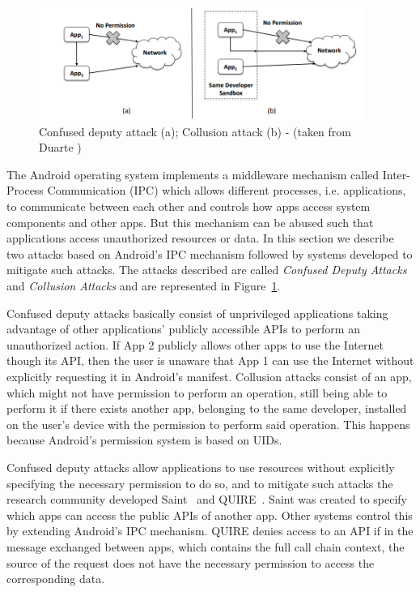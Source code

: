 \begin{figure}[t!]
	\centering
	\includegraphics[width=0.95\textwidth]{img/communicationattacks.png}
	\caption{Confused deputy attack (a); Collusion attack (b) - (taken from Duarte \cite{nunoduarte})}
	\label{fig:communicationattacks}
\end{figure}

The Android operating system implements a middleware mechanism called Inter-Process Communication (IPC) which allows different processes, i.e. applications, to communicate between each other and controls how apps access system components and other apps. But this mechanism can be abused such that applications access unauthorized resources or data. In this section we describe two attacks based on Android's IPC mechanism followed by systems developed to mitigate such attacks. The attacks described are called \emph{Confused Deputy Attacks} and \emph{Collusion Attacks} and are represented in Figure~\ref{fig:communicationattacks}.

Confused deputy attacks basically consist of unprivileged applications taking advantage of other applications’ publicly accessible APIs to perform an unauthorized action. If App 2 publicly allows other apps to use the Internet though its API, then the user is unaware that App 1 can use the Internet without explicitly requesting it in Android's manifest. Collusion attacks consist of an app, which might not have permission to perform an operation, still being able to perform it if there exists another app, belonging to the same developer, installed on the user’s device with the permission to perform said operation. This happens because Android’s permission system is based on UIDs.

Confused deputy attacks allow applications to use resources without explicitly specifying the necessary permission to do so, and to mitigate such attacks the research community developed Saint~\cite{ongtang2012semantically} and QUIRE~\cite{dietz2011quire}. Saint was created to specify which apps can access the public APIs of another app. Other systems control this by extending Android’s \ac{IPC} mechanism. QUIRE denies access to an API if in the message exchanged between apps, which contains the full call chain context, the source of the request does not have the necessary permission to access the corresponding data.

